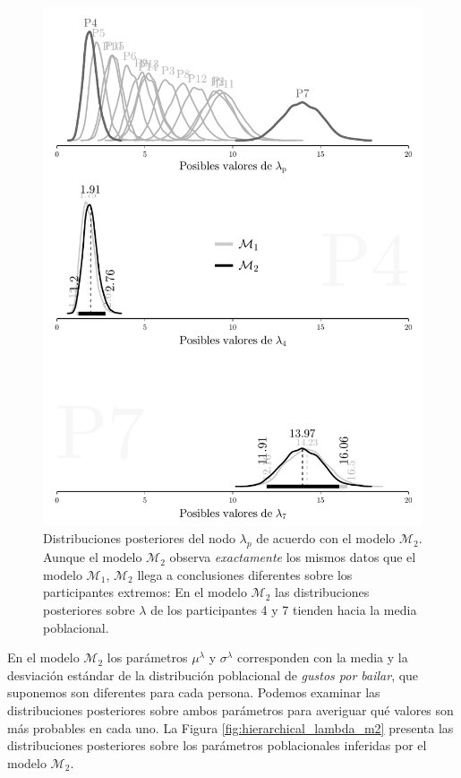 \documentclass{article}
\begin{document}
\begin{figure}[H]\centerline{\includegraphics[width=1\textwidth]{lambda_m2.pdf}}
\caption{Distribuciones posteriores del nodo $\lambda_p$ de acuerdo con el modelo $\mathcal M_2$. Aunque el modelo $\mathcal M_2$ observa \emph{exactamente} los mismos datos que el modelo $\mathcal M_1$, $\mathcal M_2$ llega a conclusiones diferentes sobre los participantes extremos: En el modelo $\mathcal M_2$ las distribuciones posteriores sobre $\lambda$ de los participantes 4 y 7 tienden hacia la media poblacional.}
\label{fig:lambda_m2}
\end{figure}

\indent En el modelo $\mathcal M_2$ los parámetros $\mu^\lambda$ y $\sigma^\lambda$ corresponden con la media y la desviación estándar de la distribución poblacional de \emph{gustos por bailar}, que suponemos son diferentes para cada persona. Podemos examinar las distribuciones posteriores sobre ambos parámetros para averiguar qué valores son más probables en cada uno. La Figura \ref{fig:hierarchical_lambda_m2} presenta las distribuciones posteriores sobre los parámetros poblacionales inferidas por el modelo $\mathcal M_2$.
\end{document}
